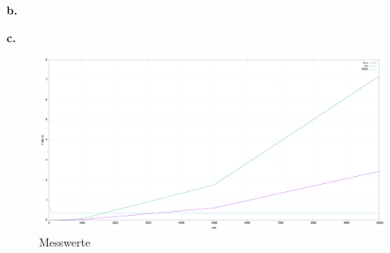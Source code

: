 \documentclass[12pt]{article}
\begin{document}
\noindent \textbf{b.}

\noindent \textbf{c.}

\begin{figure}[ht]
	\centering
	\includegraphics[width=0.9\linewidth]{../plot}
	\caption[Messwerte]{Messwerte}
	\label{fig:plot}
\end{figure}
\end{document}
